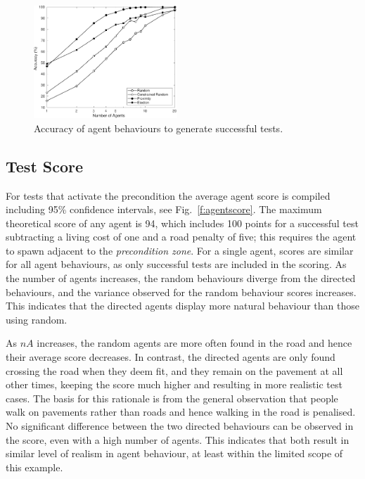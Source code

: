 \documentclass[letterpaper, 10 pt, journal, twoside]{IEEEtran}
\begin{document}
\begin{figure}[!t]
	\centering
\includegraphics[width=0.48\textwidth]{Accuracy.pdf}
	\caption{Accuracy of agent behaviours to generate successful tests.}
	\label{f:accuracy}
\end{figure}

\subsection{Test Score} \label{s:testscore}

For tests that activate the precondition the average agent score is compiled including 95\% confidence intervals, see Fig.~\ref{f:agentscore}. The maximum theoretical score of any agent is 94, which includes 100 points for a successful test subtracting a living cost of one and a road penalty of five; this requires the agent to spawn adjacent to the \textit{precondition zone}. 
For a single agent, scores are similar for all agent behaviours, as only successful tests are included in the scoring. As the number of agents increases, the random behaviours diverge from the directed behaviours, and the variance observed for the random behaviour scores increases. This indicates that the directed agents display more natural behaviour than those using random.

As $nA$ increases, the random agents are more often found in the road and hence their average score decreases. In contrast, the directed agents are only found crossing the road when they deem fit, and they remain on the pavement at all other times, keeping the score much higher and resulting in more realistic test cases. The basis for this rationale is from the general observation that people walk on pavements rather than roads and hence walking in the road is penalised. No significant difference between the two directed behaviours can be observed in the score, even with a high number of agents. This indicates that  both result in similar level of realism in agent behaviour, at least within the limited scope of this example.
\end{document}

